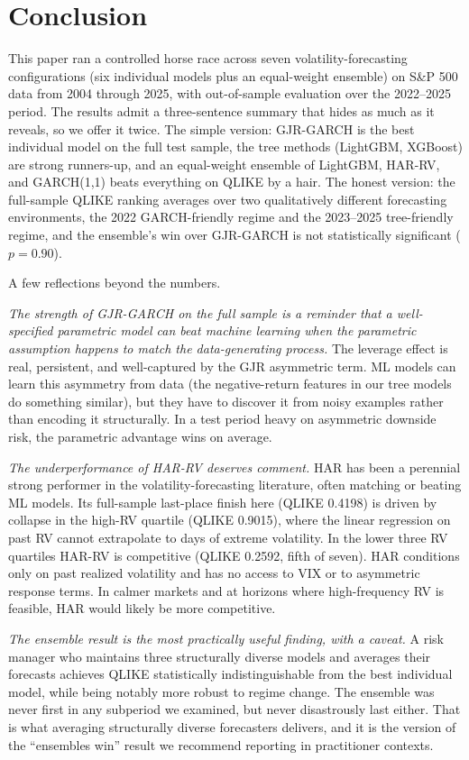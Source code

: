 \section{Conclusion}\label{sec:conclusion}

This paper ran a controlled horse race across seven volatility-forecasting
configurations (six individual models plus an equal-weight ensemble) on
S\&P 500 data from 2004 through 2025, with out-of-sample evaluation over
the 2022--2025 period. The results admit a three-sentence summary that
hides as much as it reveals, so we offer it twice. The simple version:
GJR-GARCH is the best individual model on the full test sample, the tree
methods (LightGBM, XGBoost) are strong runners-up, and an equal-weight
ensemble of LightGBM, HAR-RV, and GARCH(1,1) beats everything on QLIKE by
a hair. The honest version: the full-sample QLIKE ranking averages over
two qualitatively different forecasting environments, the 2022
GARCH-friendly regime and the 2023--2025 tree-friendly regime, and the
ensemble's win over GJR-GARCH is not statistically significant
($p = 0.90$).

A few reflections beyond the numbers.

\emph{The strength of GJR-GARCH on the full sample is a reminder that a
well-specified parametric model can beat machine learning when the
parametric assumption happens to match the data-generating process.} The
leverage effect is real, persistent, and well-captured by the GJR
asymmetric term. ML models can learn this asymmetry from data (the
negative-return features in our tree models do something similar), but
they have to discover it from noisy examples rather than encoding it
structurally. In a test period heavy on asymmetric downside risk, the
parametric advantage wins on average.

\emph{The underperformance of HAR-RV deserves comment.} HAR has been a
perennial strong performer in the volatility-forecasting literature,
often matching or beating ML models. Its full-sample last-place finish
here (QLIKE 0.4198) is driven by collapse in the high-RV quartile (QLIKE
0.9015), where the linear regression on past RV cannot extrapolate to
days of extreme volatility. In the lower three RV quartiles HAR-RV is
competitive (QLIKE 0.2592, fifth of seven). HAR conditions only on past
realized volatility and has no access to VIX or to asymmetric response
terms. In calmer markets and at horizons where high-frequency RV is
feasible, HAR would likely be more competitive.

\emph{The ensemble result is the most practically useful finding, with a
caveat.} A risk manager who maintains three structurally diverse models
and averages their forecasts achieves QLIKE statistically indistinguishable
from the best individual model, while being notably more robust to regime
change. The ensemble was never first in any subperiod we examined, but
never disastrously last either. That is what averaging structurally
diverse forecasters delivers, and it is the version of the
``ensembles win'' result we recommend reporting in practitioner contexts.

